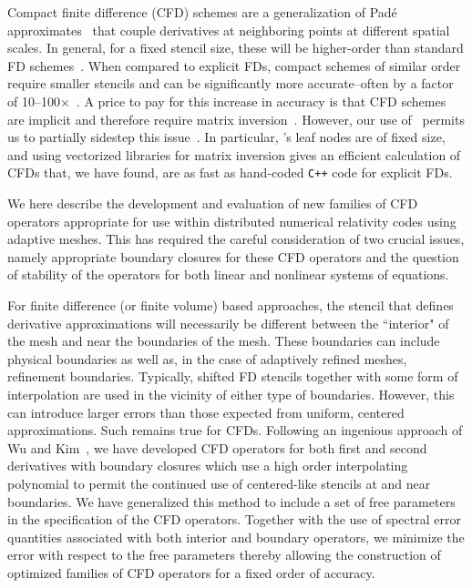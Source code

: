 Compact finite difference (CFD) schemes are a generalization of Pad\'e approximates~\cite{Lele1992}
that couple derivatives at neighboring points at different spatial scales.
In general, for a fixed stencil size, these will be higher-order than standard FD schemes~\cite{Lele1992,Kim2007,Daszuta2024}.  When compared to explicit FDs, compact schemes of similar order require
smaller stencils and can be significantly
more accurate--often by a factor of 10--100$\times$~\cite{Lele1992,Kim2007,Wang2018,Daszuta2024}.  
A price to pay for this increase in accuracy is that CFD schemes are
implicit and therefore require matrix inversion~\cite{Lele1992,Kim2013,KimSandberg2012}.  However, our use of \dendrogr\
permits us to partially sidestep this issue~\cite{Fernando2019,Fernando2023}.  In particular, 
\dendrogr's leaf nodes are of fixed size, and using
vectorized libraries for matrix inversion gives an
efficient calculation of CFDs that, we have found, are as fast as
hand-coded \texttt{C++} code for explicit FDs.  %

We here describe the development and evaluation of new families of CFD operators appropriate
for use within distributed numerical relativity codes using adaptive meshes.
This has required the careful consideration of two crucial issues, namely appropriate
boundary closures for these CFD operators and the question of stability of the
operators for both linear and nonlinear systems of equations.


For finite difference (or finite volume) based
approaches, the stencil that defines derivative approximations will necessarily
be different between the ``interior" of the mesh and near the boundaries of the mesh.  These boundaries can include physical boundaries as well as, in the case of adaptively refined meshes, refinement boundaries.  
Typically, shifted FD stencils together with some form of interpolation are used in the vicinity of either type of boundaries.  However, this can 
introduce larger errors than those expected from uniform, centered approximations.
Such remains true for CFDs.  Following an ingenious approach of
Wu and Kim~\cite{Kim2007,WuKim2024}, we have developed CFD operators for both first and
second derivatives with boundary closures which use a high order interpolating
polynomial to permit the continued use of centered-like stencils at and near
boundaries.   We have generalized this method to include a set of free parameters in the specification of the CFD operators.  Together with the use of spectral error quantities associated with both interior and boundary operators, we minimize the error with respect to the free parameters thereby allowing the construction of optimized families of CFD operators for a fixed order of accuracy.  

